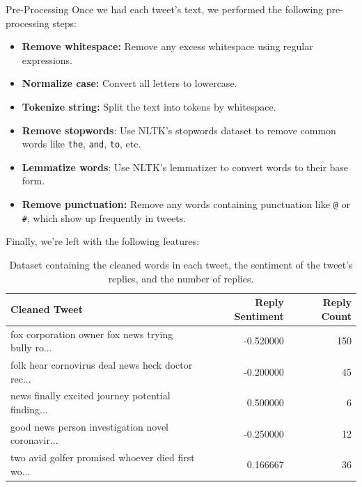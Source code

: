 \documentclass[final]{beamer}
\def\code#1{\texttt{#1}}
\newlength{\colwidth}
\begin{document}
\begin{frame}[t]
\begin{columns}[t]
\begin{column}{\colwidth}
\begin{block}{Pre-Processing}
    Once we had each tweet's text, we performed the following pre-processing steps:

    \begin{itemize}
      \item \textbf{Remove whitespace:} Remove any excess whitespace using regular expressions.
      \item \textbf{Normalize case:} Convert all letters to lowercase.
      \item \textbf{Tokenize string:} Split the text into tokens by whitespace.
      \item \textbf{Remove stopwords}: Use NLTK's stopwords dataset \cite{NLTK} to remove common words like \code{the}, \code{and}, \code{to}, etc.
      \item \textbf{Lemmatize words}: Use NLTK's lemmatizer to convert words to their base form.
      \item \textbf{Remove punctuation:} Remove any words containing punctuation like \code{@} or \code{\#}, which show up frequently in tweets.
    \end{itemize}

    Finally, we're left with the following features:

    \begin{table}
      \centering
      \begin{tabular}{l r r}
        \toprule
        \textbf{Cleaned Tweet} & \textbf{Reply Sentiment} & \textbf{Reply Count}\\
        \midrule
        fox corporation owner fox news trying bully ro...	& -0.520000	& 150 \\
        folk hear cornovirus deal news heck doctor rec...	& -0.200000	& 45 \\
        news finally excited journey potential finding...	& 0.500000	& 6 \\
        good news person investigation novel coronavir...	& -0.250000	& 12 \\
        two avid golfer promised whoever died first wo...	& 0.166667	& 36 \\
        \bottomrule
      \end{tabular}
      \caption{Dataset containing the cleaned words in each tweet, the sentiment of the tweet's replies, and the number of replies.}
    \end{table}

  \end{block}

\end{column}


\end{columns}
\end{frame}
\end{document}
